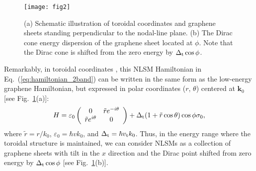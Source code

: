 \documentclass[aps,twocolumn,floatfix]{revtex4-1}
\begin{document}
\begin{figure}[!htb]
\texttt{[image: fig2]}
\caption{
(a) Schematic illustration of toroidal coordinates and graphene sheets standing perpendicular to the nodal-line plane. (b) The Dirac cone energy dispersion of the graphene sheet located at $\phi$. Note that the Dirac cone is shifted from the zero energy by $\Delta_{\rm t}\cos{\phi}$.}
\label{fig:torus}
\end{figure}

 Remarkably, in toroidal coordinates \cite{supplemental}, this NLSM Hamiltonian in Eq.~(\ref{eq:hamiltonian_2band}) can be written in the same form as the low-energy graphene Hamiltonian, but expressed in polar coordinates ($r$, $\theta$) centered at $\bm{k}_0$ [see Fig.~\ref{fig:torus}(a)]:
\begin{equation}
\label{eq:hamiltonian_graphene}
H =
\varepsilon_0 \left(
\begin{array}{cc}
0 & \tilde{r}e^{-i \theta} \\
\tilde{r}e^{i \theta} & 0
\end{array}
\right)
+\Delta_{\rm t}(1+\tilde{r} \cos{\theta})\cos{\phi} \sigma_0,
\end{equation}
where $\tilde{r}=r/k_0$, $\varepsilon_0=\hbar v k_0$, and $\Delta_{\rm t}=\hbar v_{\rm t} k_0$.
Thus, in the energy range where the toroidal structure is maintained, we can consider NLSMs as a collection of graphene sheets with tilt in the $x$ direction and the Dirac point shifted from zero energy by $\Delta_{\rm t} \cos{\phi}$ [see Fig.~\ref{fig:torus}(b)].
\end{document}

